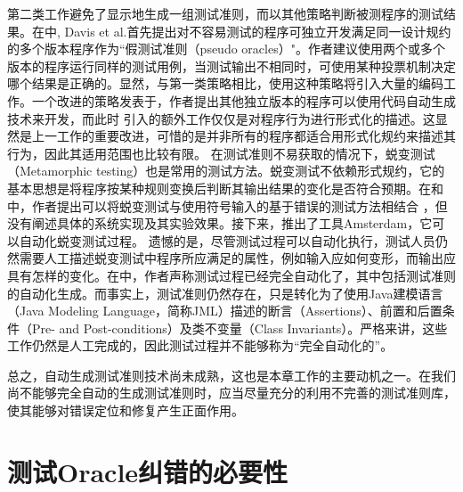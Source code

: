 第二类工作避免了显示地生成一组测试准则，而以其他策略判断被测程序的测试结果。在\cite{Davis:1981:PNP:800175.809889}中, Davis et al.首先提出对不容易测试的程序可独立开发满足同一设计规约的多个版本程序作为“假测试准则（pseudo oracles）"。作者建议使用两个或多个版本的程序运行同样的测试用例，当测试输出不相同时，可使用某种投票机制决定哪个结果是正确的。显然，与第一类策略相比，使用这种策略将引入大量的编码工作。一个改进的策略发表于\cite{257793-1992}，作者提出其他独立版本的程序可以使用代码自动生成技术来开发，而此时
引入的额外工作仅仅是对程序行为进行形式化的描述。这显然是上一工作的重要改进，可惜的是并非所有的程序都适合用形式化规约来描述其行为，因此其适用范围也比较有限。
在测试准则不易获取的情况下，蜕变测试（Metamorphic testing）也是常用的测试方法。蜕变测试不依赖形式规约，它的基本思想是将程序按某种规则变换后判断其输出结果的变化是否符合预期。在\cite{960614-chen-2001}和\cite{Chen20031}中，作者提出可以将蜕变测试与使用符号输入的基于错误的测试方法相结合%
，但没有阐述具体的系统实现及其实验效果。接下来，\cite{murphy2010automatic}\cite{Murphy:2009:AST:1572272.1572295}推出了工具Amsterdam，它可以自动化蜕变测试过程。 遗憾的是，尽管测试过程可以自动化执行，测试人员仍然需要人工描述蜕变测试中程序所应满足的属性，例如输入应如何变形，而输出应具有怎样的变化。在\cite{cheon2005complete}中，作者声称测试过程已经完全自动化了，其中包括测试准则的自动化生成。而事实上，测试准则仍然存在，只是转化为了使用Java建模语言（Java Modeling Language，简称JML）描述的断言（Assertions）、前置和后置条件（Pre- and Post-conditions）及类不变量（Class Invariants）。严格来讲，这些工作仍然是人工完成的，因此测试过程并不能够称为“完全自动化的”。


总之，自动生成测试准则技术尚未成熟，这也是本章工作的主要动机之一。在我们尚不能够完全自动的生成测试准则时，应当尽量充分的利用不完善的测试准则库，使其能够对错误定位和修复产生正面作用。

\section{测试Oracle纠错的必要性}
\label{sec: error impact}

